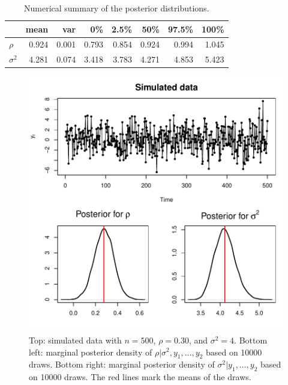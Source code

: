 \documentclass[12pt]{article}
\begin{document}
\begin{table}[H]
\begin{center}
\begin{tabular}{l|rrrrrrr}
           &  mean & var   & 0\%   & 2.5\% & 50\%  & 97.5\% & 100\% \\ \hline\hline
$\rho$     & 0.924 & 0.001 & 0.793 & 0.854 & 0.924 & 0.994  & 1.045 \\ 
$\sigma^2$ & 4.281 & 0.074 & 3.418 & 3.783 & 4.271 & 4.853  & 5.423 \\
\end{tabular}
\end{center}
\caption{Numerical summary of the posterior distributions.}
\end{table}

\newpage

\begin{figure}[H]
\begin{center}
\includegraphics[scale=0.75]{figs/fig_2.pdf}
\end{center}
\caption{Top: simulated data with $n=500$, $\rho=0.30$, and $\sigma^2=4$. Bottom left: marginal posterior density of $\rho|\sigma^2,y_1,\ldots,y_2$ based on 10000 draws. Bottom right: marginal posterior density of $\sigma^2|y_1,\ldots,y_2$ based on 10000 draws. The red lines mark the means of the draws.}
\end{figure}
\bigskip
\end{document}
